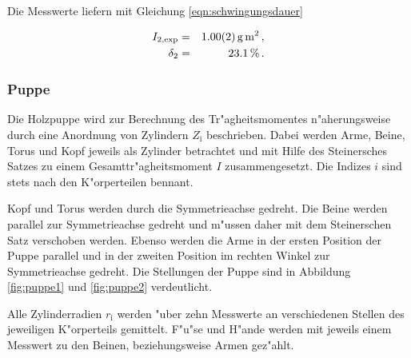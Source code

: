 				Die Messwerte liefern mit Gleichung \eqref{eqn:schwingungsdauer}

				\begin{eqnarray*}
					I_\mathrm{2, exp} & = & \SI{1.00 (2)}{\gram \meter \squared} \,, \\
					\delta_2 & = & \SI{23.1}{\percent} \,.
				\end{eqnarray*}

			\clearpage
			\subsubsection{Puppe}
			\label{subsubsec:puppe}
				Die Holzpuppe wird zur Berechnung des Tr"agheitsmomentes n"aherungsweise durch eine Anordnung von Zylindern $Z_\mathrm{i}$ beschrieben.
				Dabei werden Arme, Beine, Torus und Kopf jeweils als Zylinder betrachtet und mit Hilfe des Steinersches Satzes zu einem Gesamttr"agheitsmoment $I$ zusammengesetzt.
				Die Indizes $i$ sind stets nach den K"orperteilen bennant.

				Kopf und Torus werden durch die Symmetrieachse gedreht.
				Die Beine werden parallel zur Symmetrieachse gedreht und m"ussen daher mit dem Steinerschen Satz verschoben werden.
				Ebenso werden die Arme in der ersten Position der Puppe parallel und in der zweiten Position im rechten Winkel zur Symmetrieachse gedreht. Die Stellungen der Puppe sind in Abbildung \ref{fig:puppe1} und \ref{fig:puppe2} verdeutlicht.

				Alle Zylinderradien $r_\mathrm{i}$ werden "uber zehn Messwerte an verschiedenen Stellen des jeweiligen K"orperteils gemittelt.
				F"u"se und H"ande werden mit jeweils einem Messwert zu den Beinen, beziehungsweise Armen gez"ahlt.

